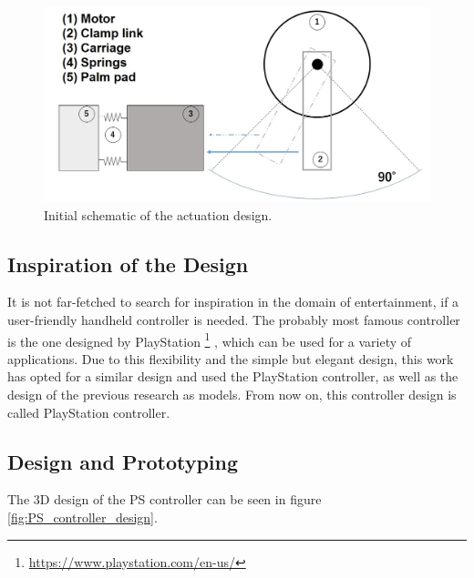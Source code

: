 \begin{figure}[h!]
	\centering
	\includegraphics[width=0.5\linewidth]{Figs/actuation_schematic.jpg}
	\caption{Initial schematic of the actuation design.}
	\label{fig:actuation_schematic}
\end{figure}

\subsection{Inspiration of the Design}
It is not far-fetched to search for inspiration in the domain of entertainment, if a user-friendly handheld controller is needed. The probably most famous controller is the one designed by PlayStation \footnote{\url{https://www.playstation.com/en-us/}}
, which can be used for a variety of applications. Due to this flexibility and the simple but elegant design, this work has opted for a similar design and used the PlayStation controller, as well as the design of the previous research as models. From now on, this controller design is called PlayStation controller.


\subsection{Design and Prototyping}
The 3D design of the PS controller can be seen in figure \ref{fig:PS_controller_design}.

